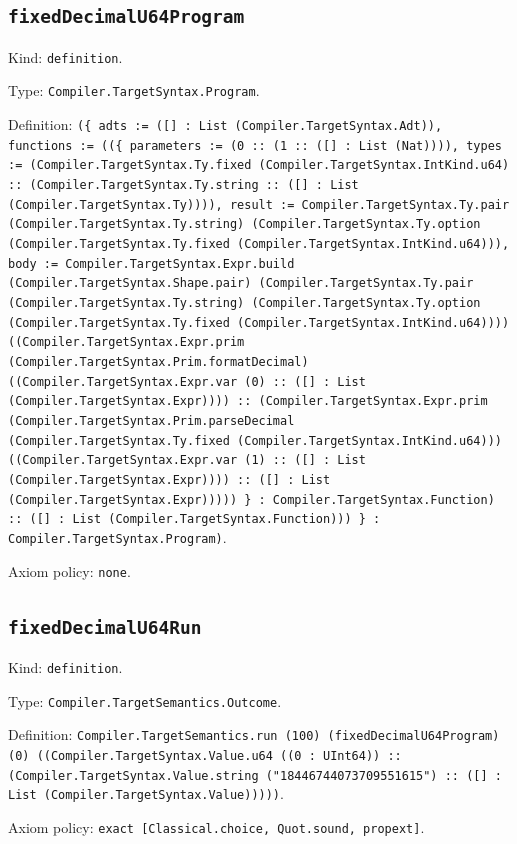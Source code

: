 \documentclass[11pt]{article}
\begin{document}
\subsection*{\texttt{fixedDecimalU64Program}}
\noindent Kind: \texttt{definition}.\par
\noindent Type: \texttt{Compiler.TargetSyntax.Program}.\par
\noindent Definition: \texttt{(\{ adts := ([] : List (Compiler.TargetSyntax.Adt)), functions := ((\{ parameters := (0 :: (1 :: ([] : List (Nat)))), types := (Compiler.TargetSyntax.Ty.fixed (Compiler.TargetSyntax.IntKind.u64) :: (Compiler.TargetSyntax.Ty.string :: ([] : List (Compiler.TargetSyntax.Ty)))), result := Compiler.TargetSyntax.Ty.pair (Compiler.TargetSyntax.Ty.string) (Compiler.TargetSyntax.Ty.option (Compiler.TargetSyntax.Ty.fixed (Compiler.TargetSyntax.IntKind.u64))), body := Compiler.TargetSyntax.Expr.build (Compiler.TargetSyntax.Shape.pair) (Compiler.TargetSyntax.Ty.pair (Compiler.TargetSyntax.Ty.string) (Compiler.TargetSyntax.Ty.option (Compiler.TargetSyntax.Ty.fixed (Compiler.TargetSyntax.IntKind.u64)))) ((Compiler.TargetSyntax.Expr.prim (Compiler.TargetSyntax.Prim.formatDecimal) ((Compiler.TargetSyntax.Expr.var (0) :: ([] : List (Compiler.TargetSyntax.Expr)))) :: (Compiler.TargetSyntax.Expr.prim (Compiler.TargetSyntax.Prim.parseDecimal (Compiler.TargetSyntax.Ty.fixed (Compiler.TargetSyntax.IntKind.u64))) ((Compiler.TargetSyntax.Expr.var (1) :: ([] : List (Compiler.TargetSyntax.Expr)))) :: ([] : List (Compiler.TargetSyntax.Expr))))) \} : Compiler.TargetSyntax.Function) :: ([] : List (Compiler.TargetSyntax.Function))) \} : Compiler.TargetSyntax.Program)}.\par
\noindent Axiom policy: \texttt{none}.\par
\subsection*{\texttt{fixedDecimalU64Run}}
\noindent Kind: \texttt{definition}.\par
\noindent Type: \texttt{Compiler.TargetSemantics.Outcome}.\par
\noindent Definition: \texttt{Compiler.TargetSemantics.run (100) (fixedDecimalU64Program) (0) ((Compiler.TargetSyntax.Value.u64 ((0 : UInt64)) :: (Compiler.TargetSyntax.Value.string ("18446744073709551615") :: ([] : List (Compiler.TargetSyntax.Value)))))}.\par
\noindent Axiom policy: \texttt{exact [Classical.choice, Quot.sound, propext]}.\par
\end{document}

